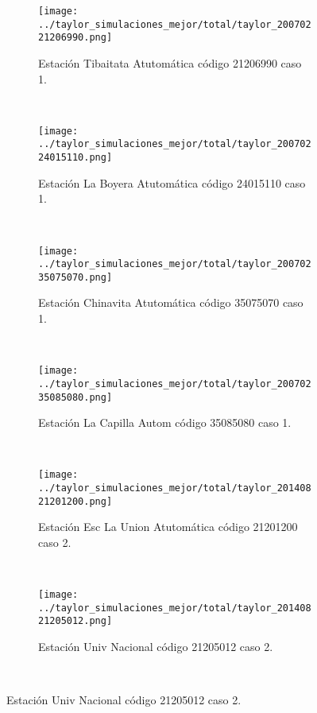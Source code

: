 \begin{figure}[H]\ContinuedFloat
\centering
\begin{subfigure}[normla]{0.4\textwidth}
\texttt{[image: ../taylor\_simulaciones\_mejor/total/taylor\_20070221206990.png]}
\caption{Estación Tibaitata Atutomática código 21206990 caso 1.}
\end{subfigure}
~
\begin{subfigure}[normla]{0.4\textwidth}
\texttt{[image: ../taylor\_simulaciones\_mejor/total/taylor\_20070224015110.png]}
\caption{Estación La Boyera Atutomática código 24015110 caso 1.}
\end{subfigure}
~
\begin{subfigure}[normla]{0.4\textwidth}
\texttt{[image: ../taylor\_simulaciones\_mejor/total/taylor\_20070235075070.png]}
\caption{Estación Chinavita Atutomática código 35075070 caso 1.}
\end{subfigure}
~
\begin{subfigure}[normla]{0.4\textwidth}
\texttt{[image: ../taylor\_simulaciones\_mejor/total/taylor\_20070235085080.png]}
\caption{Estación La Capilla Autom código 35085080 caso 1.}
\end{subfigure}
~
\begin{subfigure}[normla]{0.4\textwidth}
\texttt{[image: ../taylor\_simulaciones\_mejor/total/taylor\_20140821201200.png]}
\caption{Estación Esc La Union Atutomática código 21201200 caso 2.}
\end{subfigure}
~
\begin{subfigure}[normla]{0.4\textwidth}
\texttt{[image: ../taylor\_simulaciones\_mejor/total/taylor\_20140821205012.png]}
\caption{Estación Univ Nacional código 21205012 caso 2.}
\end{subfigure}
~
\end{figure}
 
